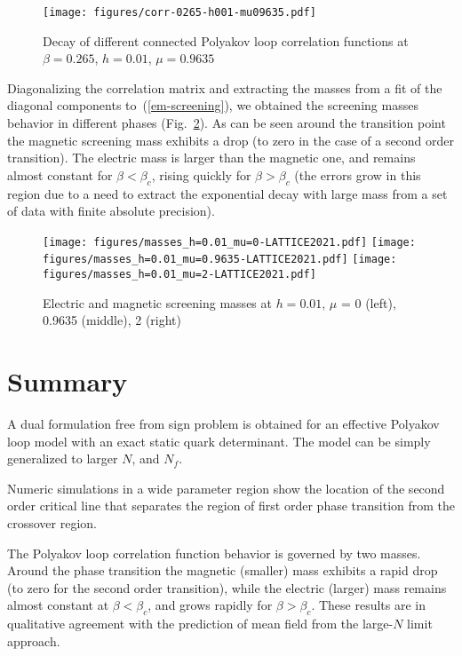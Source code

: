 \documentclass[a4paper,11pt]{article}
\begin{document}
\begin{figure}
\centering
\texttt{[image: figures/corr-0265-h001-mu09635.pdf]}
\caption{Decay of different connected Polyakov loop correlation functions at $\beta=0.265$, $h=0.01$,  $\mu = 0.9635$}
\label{fig:corr-function}
\end{figure}

Diagonalizing the correlation matrix and extracting the 
masses from a fit of the diagonal components to~(\ref{em-screening}), we obtained the screening masses behavior in different phases (Fig.~\ref{fig:screening-masses}). As can be seen around the transition point the magnetic screening mass exhibits a drop 
(to zero in the case of a second order transition). The electric mass is larger than the magnetic one, and remains almost constant for $\beta < \beta_c$, rising quickly for $\beta > \beta_c$ (the errors grow in this region due to a need to extract the exponential decay with large mass from a set of data with finite absolute precision).

\begin{figure}
\centering
\texttt{[image: figures/masses\_h=0.01\_mu=0-LATTICE2021.pdf]}
\texttt{[image: figures/masses\_h=0.01\_mu=0.9635-LATTICE2021.pdf]}
\texttt{[image: figures/masses\_h=0.01\_mu=2-LATTICE2021.pdf]}
\caption{Electric and magnetic screening masses at $h=0.01$, $\mu$ = 0 (left), 0.9635 (middle), 2 (right)}
\label{fig:screening-masses}
\end{figure}

\section {Summary}

 A dual formulation free from sign problem is obtained for an effective Polyakov loop model with an exact static quark determinant. The model can be simply generalized to larger $N$, and $N_f$.
    
 Numeric simulations in a wide parameter region show the location of the second order critical line that separates the region of first order phase transition from the crossover region.
    
 The Polyakov loop correlation function behavior is governed by two masses. Around the phase transition the magnetic (smaller) mass exhibits a rapid drop (to zero for the second order transition), while the electric (larger) mass remains almost constant at $\beta < \beta_c$, and grows rapidly for $\beta > \beta_c$.
    These results are in qualitative agreement with the prediction of mean field from the large-$N$ limit approach.
    
\end{document}
